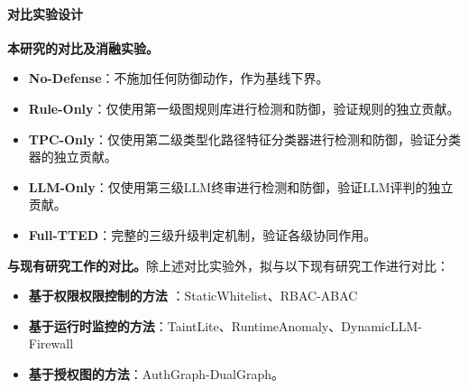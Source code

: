 \paragraph{对比实验设计}

\textbf{本研究的对比及消融实验。}
\begin{itemize}[leftmargin=2em,itemsep=0pt]
  \item \textbf{No-Defense}：不施加任何防御动作，作为基线下界。
  \item \textbf{Rule-Only}：仅使用第一级图规则库进行检测和防御，验证规则的独立贡献。
  \item \textbf{TPC-Only}：仅使用第二级类型化路径特征分类器进行检测和防御，验证分类器的独立贡献。
  \item \textbf{LLM-Only}：仅使用第三级LLM终审进行检测和防御，验证LLM评判的独立贡献。
  \item \textbf{Full-TTED}：完整的三级升级判定机制，验证各级协同作用。
\end{itemize}

\textbf{与现有研究工作的对比。}除上述对比实验外，拟与以下现有研究工作进行对比：
\begin{itemize}[leftmargin=2em,itemsep=0pt]
  \item \textbf{基于权限权限控制的方法}
：StaticWhitelist\cite{yao2023react,schick2023toolformer}、RBAC-ABAC\cite{shi2025progent}
  \item \textbf{基于运行时监控的方法}：TaintLite\cite{costa2025fides}、RuntimeAnomaly\cite{he2025sentinelagent}、DynamicLLM-Firewall\cite{abdelnabi2025firewalls}
  \item \textbf{基于授权图的方法}：AuthGraph-DualGraph\cite{wang2026aligning}。
\end{itemize}

